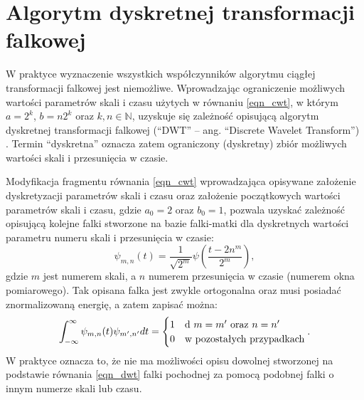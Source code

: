 \section{Algorytm dyskretnej transformacji falkowej}

W praktyce wyznaczenie wszystkich współczynników algorytmu ciągłej transformacji falkowej jest niemożliwe. Wprowadzając ograniczenie możliwych wartości parametrów skali i czasu użytych w równaniu \eqref{eqn_cwt}, w którym $a = 2^k$, $b = n2^k$ oraz $k, n \in \mathbb{N}$, uzyskuje się zależność opisującą algorytm dyskretnej transformacji falkowej (\enquote{DWT} -- ang. \enquote{Discrete Wavelet Transform}) \cite{wallen_handbook}. Termin \enquote{dyskretna} oznacza zatem ograniczony (dyskretny) zbiór możliwych wartości skali i przesunięcia w czasie.

Modyfikacja fragmentu równania \eqref{eqn_cwt} wprowadzająca opisywane założenie dyskretyzacji parametrów skali i czasu oraz założenie początkowych wartości parametrów skali i czasu, gdzie $a_0 = 2$ oraz $b_0 = 1$, pozwala uzyskać zależność opisującą kolejne falki stworzone na bazie falki-matki dla dyskretnych wartości parametru numeru skali i przesunięcia w czasie:
\begin{equation}
\psi_{m,n}(t) = \frac{1}{\sqrt{2^m}} \psi \left( \frac{t-2n^m}{2^m} \right) \label{eqn_dwt_wavelet},
\end{equation}
gdzie $m$ jest numerem skali, a $n$ numerem przesunięcia w czasie (numerem okna pomiarowego). Tak opisana falka jest zwykle ortogonalna oraz musi posiadać znormalizowaną energię, a zatem zapisać można:
\begin{equation}
\int _{-\infty} ^{\infty} \psi_{m,n}(t) \psi_{m',n'} dt =
\begin{cases}
	1 & $d $ m = m' $ oraz $ n = n' \\
	0 & $w pozostałych przypadkach$
\end{cases}
\label{eqn_dwt_orthogonal}.
\end{equation}
W praktyce oznacza to, że nie ma możliwości opisu dowolnej stworzonej na podstawie równania \eqref{eqn_dwt} falki pochodnej za pomocą podobnej falki o innym numerze skali lub czasu.

